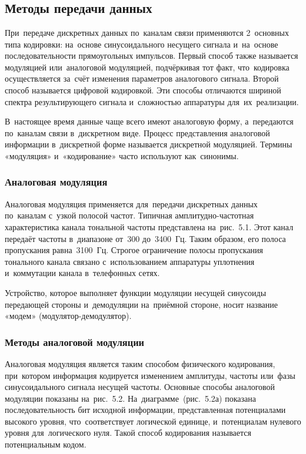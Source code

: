 \documentclass[
	a4paper,
	oneside,
	BCOR = 10mm,
	DIV = 12,
	12pt,
	headings = normal,
]{scrartcl}
\begin{document}
		\section{}
			\subsection{Методы передачи данных}
				При~передаче дискретных данных по~каналам связи применяются 2~основных типа кодировки: на~основе синусоидального несущего сигнала и~на~основе последовательности прямоугольных импульсов. Первый способ также называется модуляцией или~аналоговой модуляцией, подчёркивая тот факт, что~кодировка осуществляется за~счёт изменения параметров аналогового сигнала. Второй способ называется цифровой кодировкой. Эти способы отличаются шириной спектра результирующего сигнала и~сложностью аппаратуры для~их~реализации.

				В~настоящее время данные чаще всего имеют аналоговую форму, а~передаются по~каналам связи в~дискретном виде. Процесс представления аналоговой информации в~дискретной форме называется дискретной модуляцией. Термины «модуляция» и~«кодирование» часто используют как~синонимы. 

				\subsubsection{Аналоговая модуляция}
					Аналоговая модуляция применяется для~передачи дискретных данных по~каналам с~узкой полосой частот. Типичная амплитудно-частотная характеристика канала тональной частоты представлена на~рис.~5.1. Этот канал передаёт частоты в~диапазоне от~300 до~3400~Гц. Таким образом, его полоса пропускания равна~3100~Гц. Строгое ограничение полосы пропускания тонального канала связано с~использованием аппаратуры уплотнения и~коммутации канала в~телефонных сетях.

					Устройство, которое выполняет функции модуляции несущей синусоиды передающей стороны и~демодуляции на~приёмной стороне, носит название «модем» (модулятор-демодулятор).

				\subsubsection{Методы аналоговой модуляции}
					Аналоговая модуляция является таким способом физического кодирования, при~котором информация кодируется изменением амплитуды, частоты или~фазы синусоидального сигнала несущей частоты. Основные способы аналоговой модуляции показаны на~рис.~5.2. На~диаграмме~(рис.~5.2а) показана последовательность бит исходной информации, представленная потенциалами высокого уровня, что~соответствует логической единице, и~потенциалам нулевого уровня для~логического нуля. Такой способ кодирования называется потенциальным кодом.
					
\end{document}
